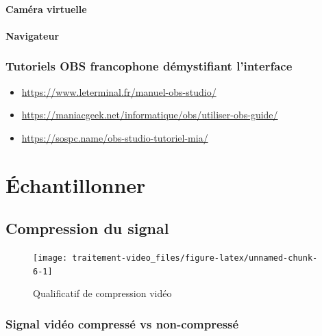 \documentclass[
  french,
]{book}
\providecommand{\tightlist}{%
  \setlength{\itemsep}{0pt}\setlength{\parskip}{0pt}}
\begin{document}
\hypertarget{camuxe9ra-virtuelle}{%
\subsubsection{Caméra virtuelle}\label{camuxe9ra-virtuelle}}

\hypertarget{navigateur}{%
\subsubsection{Navigateur}\label{navigateur}}

\hypertarget{tutoriels-obs-francophone-duxe9mystifiant-linterface}{%
\subsection{Tutoriels OBS francophone démystifiant l'interface}\label{tutoriels-obs-francophone-duxe9mystifiant-linterface}}

\begin{itemize}
\tightlist
\item
  \url{https://www.leterminal.fr/manuel-obs-studio/}
\item
  \url{https://maniacgeek.net/informatique/obs/utiliser-obs-guide/}
\item
  \url{https://sospc.name/obs-studio-tutoriel-mia/}
\end{itemize}

\hypertarget{echantillonner}{%
\chapter{Échantillonner}\label{echantillonner}}

\hypertarget{compression-du-signal}{%
\section{Compression du signal}\label{compression-du-signal}}

\begin{figure}

{\centering \texttt{[image: traitement-video\_files/figure-latex/unnamed-chunk-6-1]} 

}

\caption{Qualificatif de compression vidéo}\label{fig:unnamed-chunk-6}
\end{figure}

\hypertarget{signal-viduxe9o-compressuxe9-vs-non-compressuxe9}{%
\subsection{Signal vidéo compressé vs non-compressé}\label{signal-viduxe9o-compressuxe9-vs-non-compressuxe9}}
\end{document}
